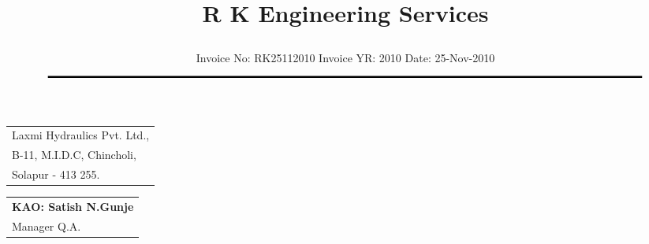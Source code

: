\documentclass[11pt]{article}
\title{\vspace*{-1.5cm} \centerline{ \Huge \bf \hspace{0cm} R K Engineering Services}\vspace*{-0.75cm}}
\author{%
 \scriptsize Invoice No: RK25112010  \hspace*{4cm}  Invoice YR: 2010 \hspace*{4cm} Date: 25-Nov-2010\\
$\rule{7.5in}{0.5mm}$}
\date{}
\begin{document}
\maketitle
\thispagestyle{empty}
\vspace*{1cm}	
\begin{flushleft}
{\footnotesize
\begin{tabular}{l}
Laxmi Hydraulics Pvt. Ltd.,\\
B-11, M.I.D.C, Chincholi,\\
Solapur - 413 255.\\
\end{tabular}
}
\end{flushleft}

\vspace*{-2cm}

\begin{flushright}
\begin{tabular}{l}
\footnotesize \bf KAO: Satish N.Gunje\\
\footnotesize Manager Q.A.\\
\end{tabular}
\end{flushright}
\vspace{1cm}
\end{document}
